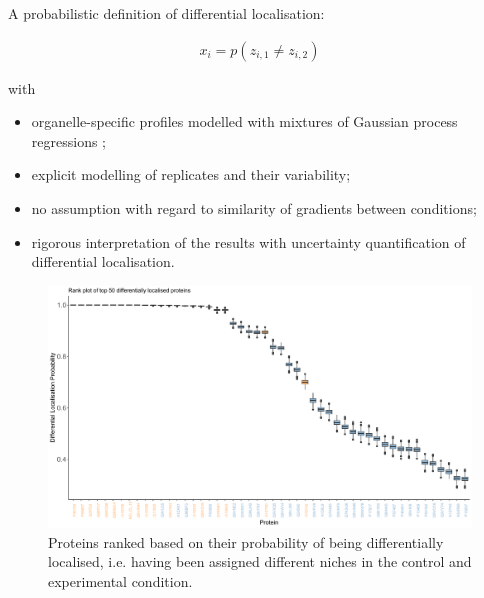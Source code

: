 \documentclass{beamer}
\theoremstyle{example}
\begin{document}
\begin{frame}
  A probabilistic definition of differential localisation:

  \begin{align}
    {x}_i = p ( z_{i, 1} \neq z_{i, 2} )
  \end{align}

  with

  \begin{itemize}
  \item organelle-specific profiles modelled with mixtures of Gaussian
    process regressions \citep{Crook:2019b};
  \item explicit modelling of replicates and their variability;
  \item no assumption with regard to similarity of gradients between
    conditions;
  \item rigorous interpretation of the results with uncertainty
    quantification of differential localisation.
  \end{itemize}

\end{frame}


\begin{frame}
  \begin{figure}[h]
    \centering
    \includegraphics[width=\linewidth]{./figs/rankboxplot.pdf}
    \caption{Proteins ranked based on their probability of being
      differentially localised, i.e. having been assigned different
      niches in the control and experimental condition.}
  \end{figure}
\end{frame}
\end{document}

